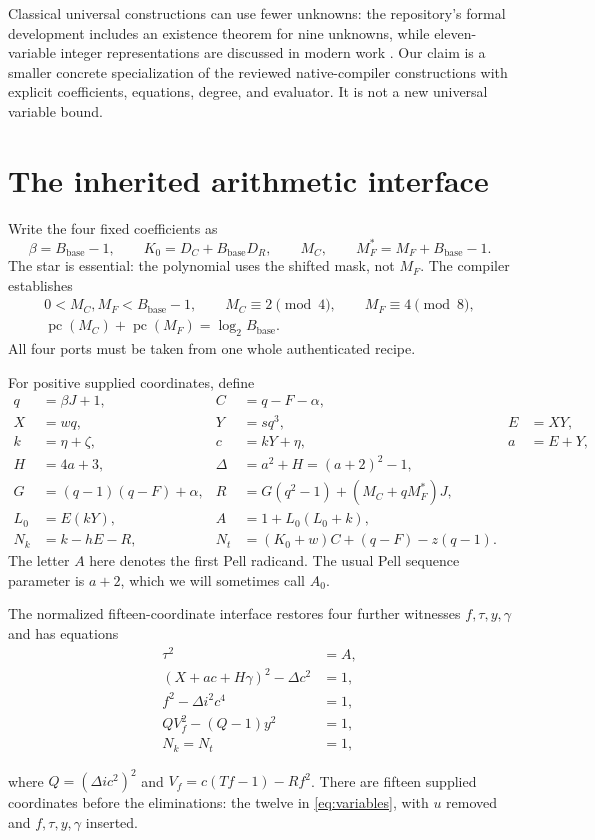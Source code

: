 \documentclass[11pt,letterpaper]{article}
\theoremstyle{remark}\newtheorem{remark}[theorem]{Remark}
\newcommand{\pc}{\operatorname{pc}}\newcommand{\PS}{\mathcal P}
\begin{document}
Classical universal constructions can use fewer unknowns: the repository's
formal development includes an existence theorem for nine unknowns, while
eleven-variable integer representations are discussed in modern work
\cite{Jones,Bayer}. Our claim is a smaller concrete specialization of the
reviewed native-compiler constructions with explicit coefficients, equations,
degree, and evaluator. It is not a new universal variable bound.

\section{The inherited arithmetic interface}\label{sec:interface}

Write the four fixed coefficients as
\[
 \beta=B_{\mathrm{base}}-1,\qquad K_0=D_C+B_{\mathrm{base}}D_R,
 \qquad M_C,\qquad M_F^*=M_F+B_{\mathrm{base}}-1.
\]
The star is essential: the polynomial uses the shifted mask, not $M_F$.
The compiler establishes
\begin{gather*}
 0<M_C,M_F<B_{\mathrm{base}}-1,\qquad
 M_C\equiv2\pmod4,\qquad M_F\equiv4\pmod8,\\
 \pc(M_C)+\pc(M_F)=\log_2 B_{\mathrm{base}}.
\end{gather*}
All four ports must be taken from one whole authenticated recipe.

For positive supplied coordinates, define
\begin{align}
 q&=\beta J+1,&C&=q-F-\alpha,\nonumber\\
 X&=wq,&Y&=sq^3,&E&=XY,\nonumber\\
 k&=\eta+\zeta,&c&=kY+\eta,&a&=E+Y,\label{eq:common1}\\
 H&=4a+3,&\Delta&=a^2+H=(a+2)^2-1,\nonumber\\
 G&=(q-1)(q-F)+\alpha,&
 R&=G(q^2-1)+(M_C+qM_F^*)J,\nonumber\\
 L_0&=E(kY),& A&=1+L_0(L_0+k),\nonumber\\
 N_k&=k-hE-R,&N_t&=(K_0+w)C+(q-F)-z(q-1).\label{eq:outer}
\end{align}
The letter $A$ here denotes the first Pell radicand. The usual Pell sequence
parameter is $a+2$, which we will sometimes call $A_0$.

\begin{samepage}
The normalized fifteen-coordinate interface restores four further witnesses
$f,\tau,y,\gamma$ and has equations
\begin{align}
 \tau^2&=A,\label{eq:oldfirst}\\
 (X+ac+H\gamma)^2-\Delta c^2&=1,\label{eq:oldmain}\\
 f^2-\Delta i^2c^4&=1,\label{eq:oldstrong}\\
 QV_f^2-(Q-1)y^2&=1,\label{eq:oldaux}\\
 N_k=N_t&=1,\label{eq:oldouter}
\end{align}
\end{samepage}
where $Q=(\Delta i c^2)^2$ and
$V_f=c(Tf-1)-Rf^2$. There are fifteen supplied coordinates before the
eliminations: the twelve in \eqref{eq:variables}, with $u$ removed and
$f,\tau,y,\gamma$ inserted.
\end{document}
